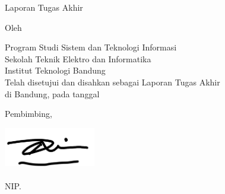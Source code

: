 \clearpage
\pagestyle{empty}

\begin{center}
	\smallskip

	\Large \bfseries {\thetitle}
	\vfill

	\Large Laporan Tugas Akhir
	\vfill

	\large Oleh

	\Large \theauthor

	\large Program Studi Sistem dan Teknologi Informasi \\

	\normalsize \normalfont
	Sekolah Teknik Elektro dan Informatika \\
	Institut Teknologi Bandung \\

	\vfill
	\normalsize \normalfont
	Telah disetujui dan disahkan 	sebagai Laporan Tugas Akhir \\
	di Bandung, pada tanggal \tanggalpengesahan

	\vspace{0.5cm}
	Pembimbing,

	\includegraphics[width=0.3\textwidth]{images/ttdriz.jpg} \\~
	\underline{\namadosbingfull
	} \\
	NIP. \nipdosbing

\end{center}
\clearpage
